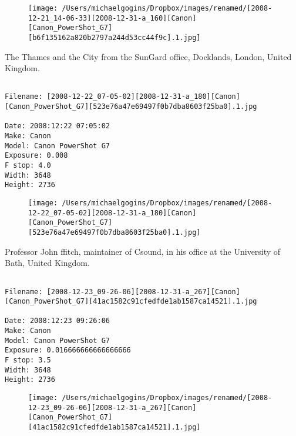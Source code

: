 \documentclass[11pt,letter,DIV=14,paper=landscape]{scrbook}
\begin{document}
\begin{figure}
\texttt{[image: /Users/michaelgogins/Dropbox/images/renamed/[2008-12-21\_14-06-33][2008-12-31-a\_160][Canon][Canon\_PowerShot\_G7][b6f135162a820b2797a244d53cc44f9c].1.jpg]}
\end{figure}
    
\clearpage
\noindent The Thames and the City from the SunGard office, Docklands, London, United Kingdom.
\noindent
\begin{lstlisting}

Filename: [2008-12-22_07-05-02][2008-12-31-a_180][Canon][Canon_PowerShot_G7][523e76a47e69497f0b7dba8603f25ba0].1.jpg

Date: 2008:12:22 07:05:02
Make: Canon
Model: Canon PowerShot G7
Exposure: 0.008
F stop: 4.0
Width: 3648
Height: 2736
\end{lstlisting}
\clearpage

\begin{figure}
\texttt{[image: /Users/michaelgogins/Dropbox/images/renamed/[2008-12-22\_07-05-02][2008-12-31-a\_180][Canon][Canon\_PowerShot\_G7][523e76a47e69497f0b7dba8603f25ba0].1.jpg]}
\end{figure}
    
\clearpage
\noindent Professor John ffitch, maintainer of Csound, in his office at the University of Bath, United Kingdom.
\noindent
\begin{lstlisting}

Filename: [2008-12-23_09-26-06][2008-12-31-a_267][Canon][Canon_PowerShot_G7][41ac1582c91cfedfde1ab1587ca14521].1.jpg

Date: 2008:12:23 09:26:06
Make: Canon
Model: Canon PowerShot G7
Exposure: 0.016666666666666666
F stop: 3.5
Width: 3648
Height: 2736
\end{lstlisting}
\clearpage

\begin{figure}
\texttt{[image: /Users/michaelgogins/Dropbox/images/renamed/[2008-12-23\_09-26-06][2008-12-31-a\_267][Canon][Canon\_PowerShot\_G7][41ac1582c91cfedfde1ab1587ca14521].1.jpg]}
\end{figure}
    
\end{document}
